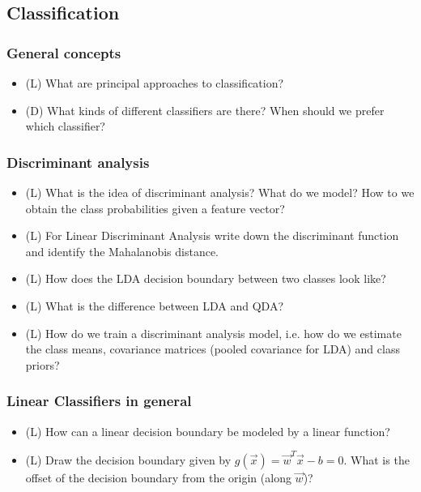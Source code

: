 \subsection*{Classification}

\subsubsection*{General concepts}

\begin{itemize}
    \item (L) What are principal approaches to classification?
    \answerboxM
    \item (D) What kinds of different classifiers are there? When should we prefer which classifier?
    \answerboxL
\end{itemize}

\subsubsection*{Discriminant analysis}

\begin{itemize}
    \item (L) What is the idea of discriminant analysis? What do we model? How to we obtain the class probabilities given a feature vector?
    \answerboxM
    \item (L) For Linear Discriminant Analysis write down the discriminant function and identify 
    the Mahalanobis distance.
    \answerboxM
    \item (L) How does the LDA decision boundary between two classes look like?
    \answerboxM
    \item (L) What is the difference between LDA and QDA?
    \answerboxM
    \item (L) How do we train a discriminant analysis model, i.e. how do we estimate
    the class means, covariance matrices (pooled covariance for LDA) and class priors?
    \answerboxM
\end{itemize}

\subsubsection*{Linear Classifiers in general}
\begin{itemize}
    \item (L) How can a linear decision boundary be modeled by a linear function?
    \answerboxM
    \item (L) Draw the decision boundary given by $g(\vec{x}) = \vec{w}^T \vec{x} - b = 0$. 
    What is the offset of the decision boundary from the origin (along $\vec{w}$)?
    \answerboxM
\end{itemize}

